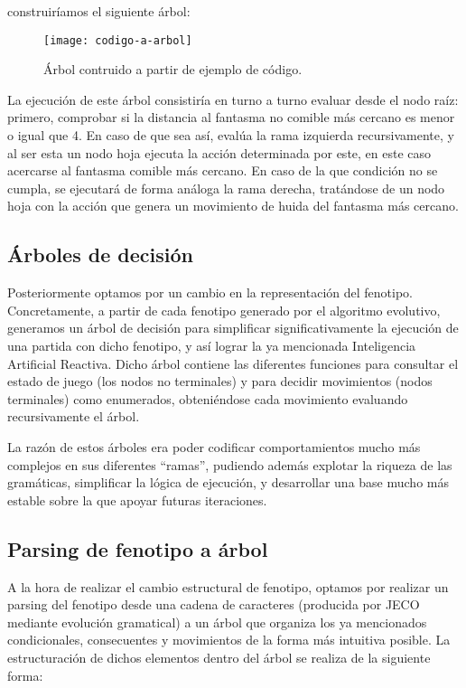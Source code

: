 construiríamos el siguiente árbol:
\begin{figure}[H]
\centering
\texttt{[image: codigo-a-arbol]}
\caption{Árbol contruido a partir de ejemplo de código.}
\end{figure}
La ejecución de este árbol consistiría en turno a turno evaluar desde el nodo raíz: primero, comprobar si la distancia al fantasma no comible más cercano es menor o igual que 4. En caso de que sea así, evalúa la rama izquierda recursivamente, y al ser esta un nodo hoja ejecuta la acción determinada por este, en este caso acercarse al fantasma comible más cercano. En caso de la que condición no se cumpla, se ejecutará de forma análoga la rama derecha, tratándose de un nodo hoja con la acción que genera un movimiento de huida del fantasma más cercano. 

\subsection{Árboles de decisión}
Posteriormente optamos por un cambio en la representación del fenotipo. Concretamente, a partir de cada fenotipo generado por el algoritmo evolutivo, generamos un árbol de decisión para simplificar significativamente la ejecución de una partida con dicho fenotipo, y así lograr la ya mencionada Inteligencia Artificial Reactiva. Dicho árbol contiene las diferentes funciones para consultar el estado de juego (los nodos no terminales) y para decidir movimientos (nodos terminales) como enumerados, obteniéndose cada movimiento evaluando recursivamente el árbol.
 
La razón de estos árboles era poder codificar comportamientos mucho más complejos en sus diferentes ``ramas'', pudiendo además explotar la riqueza de las gramáticas, simplificar la lógica de ejecución, y desarrollar una base mucho más estable sobre la que apoyar futuras iteraciones.

\subsection{Parsing de fenotipo a árbol}
A la hora de realizar el cambio estructural de fenotipo, optamos por realizar un parsing del fenotipo desde una cadena de caracteres (producida por JECO mediante evolución gramatical) a un árbol que organiza los ya mencionados condicionales, consecuentes y movimientos de la forma más intuitiva posible. La estructuración de dichos elementos dentro del árbol se realiza de la siguiente forma:

